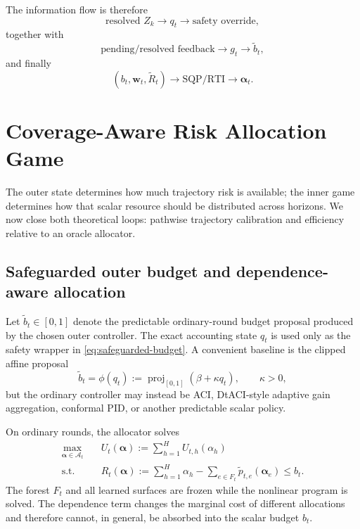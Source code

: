 \documentclass[11pt]{article}
\begin{document}
The information flow is therefore
\[
    \text{resolved }Z_k
    \longrightarrow
    q_t
    \longrightarrow
    \text{safety override},
\]
together with
\[
    \text{pending/resolved feedback}
    \longrightarrow
    g_t
    \longrightarrow
    \widetilde b_t,
\]
and finally
\[
    (b_t,\bm w_t,\widetilde R_t)
    \longrightarrow
    \text{SQP/RTI}
    \longrightarrow
    \bm\alpha_t.
\]


\section{Coverage-Aware Risk Allocation Game}
\label{sec:risk-allocation-game}

The outer state determines how much trajectory risk is available; the inner game
determines how that scalar resource should be distributed across horizons.  We
now close both theoretical loops: pathwise trajectory calibration and efficiency
relative to an oracle allocator.

\subsection{Safeguarded outer budget and dependence-aware allocation}

Let $\widetilde b_t\in[0,1]$ denote the predictable ordinary-round budget
proposal produced by the chosen outer controller.  The exact accounting state
$q_t$ is used only as the safety wrapper in
\eqref{eq:safeguarded-budget}.  A convenient baseline is the clipped affine
proposal
\begin{equation}
    \widetilde b_t
    =
    \phi(q_t)
    :=
    \operatorname{proj}_{[0,1]}(\beta+\kappa q_t),
    \qquad \kappa>0,
    \label{eq:linear-budget-map}
\end{equation}
but the ordinary controller may instead be ACI, DtACI-style adaptive gain
aggregation, conformal PID, or another predictable scalar policy.

On ordinary rounds, the allocator solves
\begin{equation}
\boxed{
\begin{aligned}
    \max_{\bm\alpha\in\mathcal A_t}\quad
        & U_t(\bm\alpha)
        :=
        \sum_{h=1}^H U_{t,h}(\alpha_h)\\
    \text{s.t.}\quad
        & \widehat R_t(\bm\alpha)
        :=
        \sum_{h=1}^H\alpha_h
        -
        \sum_{e\in F_t}\widetilde p_{t,e}(\bm\alpha_e)
        \le b_t.
\end{aligned}}
\label{eq:allocation-game}
\end{equation}
The forest $F_t$ and all learned surfaces are frozen while the nonlinear
program is solved.  The dependence term changes the marginal cost of different
allocations and therefore cannot, in general, be absorbed into the scalar
budget $b_t$.
\end{document}
